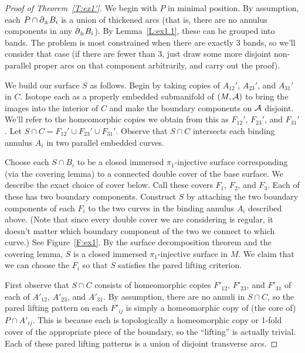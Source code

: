 \begin{proof}[Proof of Theorem~\ref{T:ex1'}]

We begin with $P$ in minimal position. By assumption, each $P \cap \partial_\pm B_i$
is a union of thickened arcs (that is, there are no annulus components in any
$\partial_\pm B_i$). By Lemma~\ref{L:ex1.1}, these can be grouped into bands. The
problem is most constrained when there are exactly 3 bands, so we'll consider
that case (if there are fewer than 3, just draw some more disjoint non-parallel
proper arcs on that component arbitrarily, and carry out the proof).

We build our surface $S$ as follows. Begin by taking copies of  $A_{12}'$,
$A_{23}'$, and $A_{31}'$ in $C$. Isotope each as a properly embedded
submanifold of $(M,\mathcal{A})$ to bring the images into the interior of $C$ and make
the boundary components on $\mathcal{A}$ disjoint. We'll refer to the homeomorphic
copies we obtain from this as $F_{12}'$, $F_{23}'$, and $F_{31}'$. Let $S\cap
C = F_{12}' \cup F_{23}' \cup F_{31}'$. Observe that $S\cap C$ intersects each
binding annulus $A_i$ in two parallel embedded curves.

Choose each $S \cap B_i$ to be a closed immersed $\pi_1$-injective surface
corresponding (via the covering lemma) to a connected double cover of the base
surface. We describe the exact choice of cover below. Call these covers $F_1$,
$F_2$, and $F_3$.  Each of these has two boundary components. Construct $S$ by
attaching the two boundary components of each $F_i$ to the two curves in the
binding annulus $A_i$ described above. (Note that since every double cover we
are considering is regular, it doesn't matter which boundary component of the
two we connect to which curve.) See Figure~\ref{F:ex1}. By the surface
decomposition theorem and the covering lemma, $S$ is a closed immersed
$\pi_1$-injective surface in $M$.  We claim that we can choose the $F_i$ so
that $S$ satisfies the pared lifting criterion.


First observe that $S \cap C$ consists of homeomorphic copies $F'_{12}$,
$F'_{23}$, and $F'_{31}$ of each of $A'_{12}$, $A'_{23}$, and $A'_{31}$. By
assumption, there are no annuli in $S \cap C$, so the pared lifting pattern on
each $F'_{ij}$ is simply a homeomorphic copy of (the core of) $P \cap A'_{ij}$.
This is because each is topologically a homeomorphic copy or 1-fold cover of
the appropriate piece of the boundary, so the ``lifting'' is actually trivial.
Each of these pared lifting patterns is a union of disjoint transverse arcs.


\end{proof}
